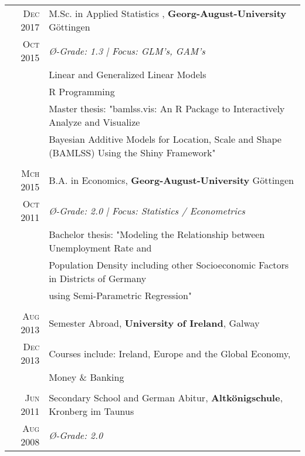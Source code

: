 \documentclass[a4paper,10pt]{article} %
\begin{document}
\begin{tabular}{rl}
\textsc{Dec 2017}& M.Sc. in Applied Statistics , \textbf{Georg-August-University} Göttingen\\
\textsc{Oct 2015}& \emph{{{\O}}-Grade: 1.3 | Focus: GLM's, GAM's}\\
& \footnotesize{Linear and Generalized Linear Models} \\
& \footnotesize{R Programming} \\
& \footnotesize{Master thesis: "bamlss.vis: An R Package to Interactively Analyze and Visualize} \\
& \footnotesize{Bayesian Additive Models for Location, Scale and Shape (BAMLSS) Using the Shiny Framework"} \\
&\\




\textsc{Mch 2015}& B.A. in Economics, \textbf{Georg-August-University} Göttingen\\
\textsc{Oct 2011}& \emph{{{\O}}-Grade: 2.0 | Focus: Statistics / Econometrics}\\
&\footnotesize{Bachelor thesis: "Modeling the Relationship between
Unemployment Rate and}\\
&\footnotesize{Population Density including other
Socioeconomic Factors in Districts of
Germany}\\
& \footnotesize{using Semi-Parametric Regression"} \\
&\\


\textsc{Aug 2013} & Semester Abroad, \textbf{University of Ireland}, Galway\\
\textsc{Dec 2013} & \footnotesize{Courses include: Ireland, Europe and the Global Economy,}\\
& \footnotesize{Money \& Banking} \\
&\\

\textsc{Jun 2011} & Secondary School and German Abitur, \textbf{Altkönigschule}, Kronberg im Taunus\\
\textsc{Aug 2008}& \emph{{\O}-Grade: 2.0}\\

\end{tabular}

\end{document}
